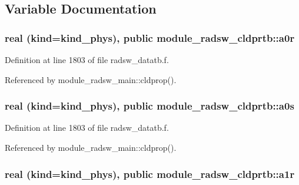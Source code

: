 \subsection{Variable Documentation}
\subsubsection[{\texorpdfstring{a0r}{a0r}}]{\setlength{\rightskip}{0pt plus 5cm}real (kind=kind\+\_\+phys), public module\+\_\+radsw\+\_\+cldprtb\+::a0r}\hypertarget{namespacemodule__radsw__cldprtb_a0fdb9425031a10735e11d7f5c9e0376e}{}\label{namespacemodule__radsw__cldprtb_a0fdb9425031a10735e11d7f5c9e0376e}


Definition at line 1803 of file radsw\+\_\+datatb.\+f.



Referenced by module\+\_\+radsw\+\_\+main\+::cldprop().

\subsubsection[{\texorpdfstring{a0s}{a0s}}]{\setlength{\rightskip}{0pt plus 5cm}real (kind=kind\+\_\+phys), public module\+\_\+radsw\+\_\+cldprtb\+::a0s}\hypertarget{namespacemodule__radsw__cldprtb_a81ba576e28e5844772d040ff7543faae}{}\label{namespacemodule__radsw__cldprtb_a81ba576e28e5844772d040ff7543faae}


Definition at line 1803 of file radsw\+\_\+datatb.\+f.



Referenced by module\+\_\+radsw\+\_\+main\+::cldprop().

\subsubsection[{\texorpdfstring{a1r}{a1r}}]{\setlength{\rightskip}{0pt plus 5cm}real (kind=kind\+\_\+phys), public module\+\_\+radsw\+\_\+cldprtb\+::a1r}\hypertarget{namespacemodule__radsw__cldprtb_a9826a0616c434620200ce4652b5af800}{}\label{namespacemodule__radsw__cldprtb_a9826a0616c434620200ce4652b5af800}


